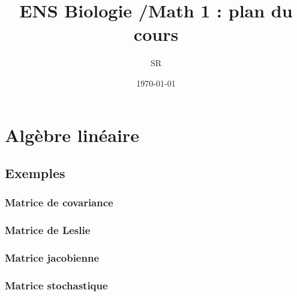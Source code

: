 \documentclass[french, 12pt]{report}
\title{ENS Biologie /Math 1 : plan du cours}
\author{SR}
\date{\today}
\numberwithin{exercise}{section}
\numberwithin{equation}{section}
\begin{document}

\maketitle
\dominitoc
\tableofcontents

\chapter{Algèbre linéaire}

\section{Exemples}
\minitoc

\subsection{Matrice de covariance}

\subsection{Matrice de Leslie}

\subsection{Matrice jacobienne}

\subsection{Matrice stochastique}

\end{document}
